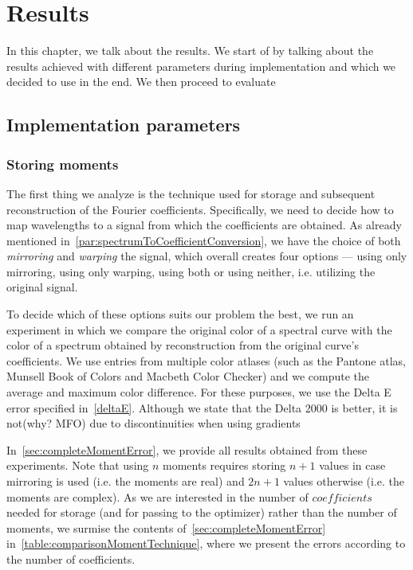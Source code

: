 \chapter{Results} \label{chap:results}

In this chapter, we talk about the results. We start of by talking about the results achieved with different parameters during implementation and which we decided to use in the end. We then proceed to evaluate

\section{Implementation parameters}

\subsection{Storing moments} \label{sec:storingMoments}

The first thing we analyze is the technique used for storage and subsequent reconstruction of the Fourier coefficients. Specifically, we need to decide how to map wavelengths to a signal from which the coefficients are obtained. As already mentioned in~\cref{par:spectrumToCoefficientConversion}, we have the choice of both \emph{mirroring} and \emph{warping} the signal, which overall creates four options --- using only mirroring, using only warping, using both or using neither, i.e. utilizing the original signal.

To decide which of these options suits our problem the best, we run an experiment in which we compare the original color of a spectral curve with the color of a spectrum obtained by reconstruction from the original curve's coefficients. We use entries from multiple color atlases (such as the Pantone atlas, Munsell Book of Colors and Macbeth Color Checker) and we compute the average and maximum color difference. For these purposes, we use the Delta E error specified in~\cref{deltaE}. Although we state that the Delta 2000 is better, it is not(why? MFO) due to  discontinuities when using gradients

In~\cref{sec:completeMomentError}, we provide all results obtained from these experiments. Note that using $n$ moments requires storing $n+1$ values in case mirroring is used (i.e. the moments are real) and $2n+1$ values otherwise (i.e. the moments are complex). As we are interested in the number of $coefficients$ needed for storage (and for passing to the optimizer) rather than the number of moments, we surmise the contents of~\cref{sec:completeMomentError} in~\cref{table:comparisonMomentTechnique}, where we present the errors according to the number of coefficients.

